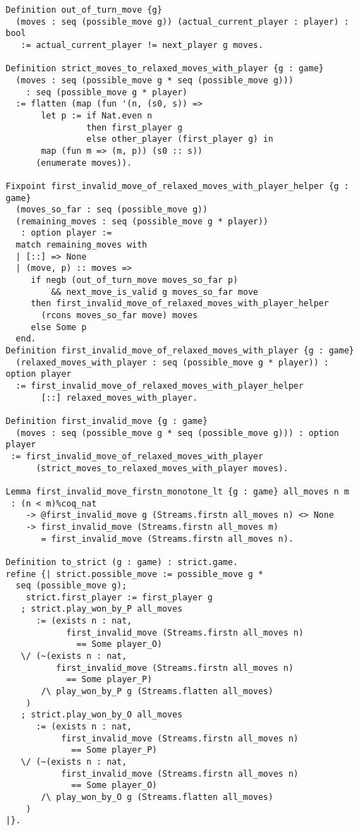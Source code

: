 \documentclass{article}
\theoremstyle{definition}
\begin{document}
\begin{verbatim}
Definition out_of_turn_move {g}
  (moves : seq (possible_move g)) (actual_current_player : player) : bool
   := actual_current_player != next_player g moves.

Definition strict_moves_to_relaxed_moves_with_player {g : game}
  (moves : seq (possible_move g * seq (possible_move g)))
    : seq (possible_move g * player)
  := flatten (map (fun '(n, (s0, s)) =>
       let p := if Nat.even n
                then first_player g
                else other_player (first_player g) in
       map (fun m => (m, p)) (s0 :: s))
      (enumerate moves)).

Fixpoint first_invalid_move_of_relaxed_moves_with_player_helper {g : game}
  (moves_so_far : seq (possible_move g))
  (remaining_moves : seq (possible_move g * player))
   : option player := 
  match remaining_moves with 
  | [::] => None
  | (move, p) :: moves => 
     if negb (out_of_turn_move moves_so_far p)
         && next_move_is_valid g moves_so_far move 
     then first_invalid_move_of_relaxed_moves_with_player_helper 
       (rcons moves_so_far move) moves
     else Some p
  end.
Definition first_invalid_move_of_relaxed_moves_with_player {g : game}
  (relaxed_moves_with_player : seq (possible_move g * player)) : option player
  := first_invalid_move_of_relaxed_moves_with_player_helper
       [::] relaxed_moves_with_player.

Definition first_invalid_move {g : game}
  (moves : seq (possible_move g * seq (possible_move g))) : option player
 := first_invalid_move_of_relaxed_moves_with_player
      (strict_moves_to_relaxed_moves_with_player moves).  

Lemma first_invalid_move_firstn_monotone_lt {g : game} all_moves n m
 : (n < m)%coq_nat
    -> @first_invalid_move g (Streams.firstn all_moves n) <> None
    -> first_invalid_move (Streams.firstn all_moves m)
       = first_invalid_move (Streams.firstn all_moves n).
       
Definition to_strict (g : game) : strict.game.
refine {| strict.possible_move := possible_move g * 
  seq (possible_move g);
    strict.first_player := first_player g
   ; strict.play_won_by_P all_moves
      := (exists n : nat,
            first_invalid_move (Streams.firstn all_moves n) 
              == Some player_O) 
   \/ (~(exists n : nat,
          first_invalid_move (Streams.firstn all_moves n) 
            == Some player_P)
       /\ play_won_by_P g (Streams.flatten all_moves)
    ) 
   ; strict.play_won_by_O all_moves
      := (exists n : nat,
           first_invalid_move (Streams.firstn all_moves n) 
             == Some player_P) 
   \/ (~(exists n : nat,
           first_invalid_move (Streams.firstn all_moves n) 
             == Some player_O)
       /\ play_won_by_O g (Streams.flatten all_moves)
    )
|}.
\end{verbatim}
\end{document}
